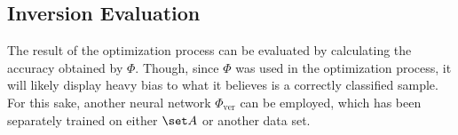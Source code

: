 \subsection{Inversion Evaluation}
The result of the optimization process can be evaluated by calculating the accuracy obtained by $\Phi$. 
Though, since $\Phi$ was used in the optimization process, it will likely display heavy bias to what it believes is a correctly classified sample.
For this sake, another neural network $\Phi_{\text{ver}}$ can be employed, which has been separately trained on either $\set A$ or another data set. 




